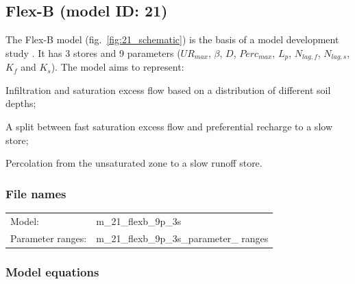 \subsection{Flex-B (model ID: 21)}
The Flex-B model (fig.~\ref{fig:21_schematic}) is the basis of a model development study \citep{Fenicia2008}. It has 3 stores and 9 parameters ($UR_{max}$, $\beta$, $D$, $Perc_{max}$, $L_p$, $N_{lag,f}$, $N_{lag,s}$, $K_f$ and $K_s$). The model aims to represent:

\begin{itemizecompact}
\item Infiltration and saturation excess flow based on a distribution of different soil depths;
\item A split between fast saturation excess flow and preferential recharge to a slow store;
\item Percolation from the unsaturated zone to a slow runoff store.
\end{itemizecompact}

\subsubsection{File names}
\begin{tabular}{@{}ll}
Model: &m\_21\_flexb\_9p\_3s \\
Parameter ranges: &m\_21\_flexb\_9p\_3s\_parameter\_ ranges \\
\end{tabular}

\subsubsection{Model equations}

